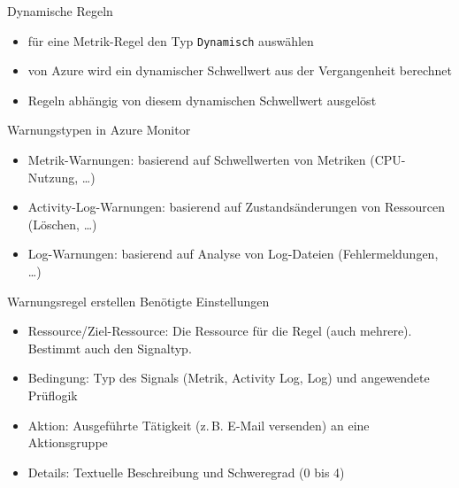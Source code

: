 
\begin{flashcard}[Definition]{Dynamische Regeln}
    \begin{itemize}
        \item für eine Metrik-Regel den Typ \texttt{Dynamisch} auswählen
        \item von Azure wird ein dynamischer Schwellwert aus der Vergangenheit berechnet
        \item Regeln abhängig von diesem dynamischen Schwellwert ausgelöst
    \end{itemize}
\end{flashcard}


\begin{flashcard}[Definition]{Warnungstypen in Azure Monitor}
    \begin{itemize}
        \item Metrik-Warnungen:\newline
            basierend auf Schwellwerten von Metriken (CPU-Nutzung, \ldots)
        \item Activity-Log-Warnungen:\newline
            basierend auf Zustandsänderungen von Ressourcen (Löschen, \ldots)
        \item Log-Warnungen:\newline
            basierend auf Analyse von Log-Dateien (Fehlermeldungen, \ldots)
    \end{itemize}
\end{flashcard}

\begin{flashcard}[Definition]{Warnungsregel erstellen}
    Benötigte Einstellungen
    \begin{itemize}
        \item Ressource/Ziel-Ressource:\newline
            Die Ressource für die Regel (auch mehrere). Bestimmt auch den Signaltyp.
        \item Bedingung:\newline
            Typ des Signals (Metrik, Activity Log, Log) und angewendete Prüflogik
        \item Aktion:\newline
            Ausgeführte Tätigkeit (z.\,B. E-Mail versenden) an eine Aktionsgruppe
        \item Details:\newline
            Textuelle Beschreibung und Schweregrad (0 bis 4)
    \end{itemize}
    \vspace{1cm}
\end{flashcard}

